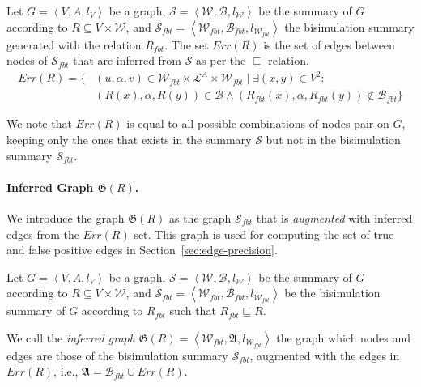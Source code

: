 \begin{definition}
Let $G=\left\langle V, A, l_V \right\rangle$ be a graph, $\mathcal{S} = \left\langle \mathcal{W}, \mathcal{B}, l_{\mathcal{W}} \right\rangle$ be the summary of $G$ according to $R \subseteq V \times \mathcal{W}$, and $\mathcal{S}_{fbt} = \left\langle \mathcal{W}_{fbt}, \mathcal{B}_{fbt}, l_{\mathcal{W}_{fbt}} \right\rangle$ the bisimulation summary generated with the relation $R_{fbt}$.
The set $Err(R)$ is the set of edges between nodes of $\mathcal{S}_{fbt}$ that are inferred from $\mathcal{S}$ as per the $\sqsubseteq$ relation.
\begin{equation*}
\begin{split}
Err(R) = \{ & (u, \alpha, v) \in \mathcal{W}_{fbt} \times \mathcal{L}^A \times \mathcal{W}_{fbt} \mid \exists (x, y) \in V^2 :\\
 & (R(x), \alpha, R(y)) \in \mathcal{B} \wedge (R_{fbt}(x), \alpha, R_{fbt}(y)) \not \in \mathcal{B}_{fbt} \}
\end{split}
\end{equation*}
\end{definition}

We note that $Err(R)$ is equal to all possible combinations of nodes pair on $G$, keeping only the ones that exists in the summary $\mathcal{S}$ but not in the bisimulation summary $\mathcal{S}_{fbt}$.

\paragraph{Inferred Graph $\mathfrak{G}(R)$.}

We introduce the graph $\mathfrak{G}(R)$ as the graph $\mathcal{S}_{fbt}$ that is \emph{augmented} with inferred edges from the $Err(R)$ set. This graph is used for computing the set of true and false positive edges in Section~\ref{sec:edge-precision}.

\begin{definition}
Let $G=\left\langle V, A, l_V \right\rangle$ be a graph, $\mathcal{S} = \left\langle \mathcal{W}, \mathcal{B}, l_{\mathcal{W}} \right\rangle$ be the summary of $G$ according to $R \subseteq V \times \mathcal{W}$, and $\mathcal{S}_{fbt} = \left\langle \mathcal{W}_{fbt}, \mathcal{B}_{fbt}, l_{\mathcal{W}_{fbt}} \right\rangle$ be the bisimulation summary of $G$ according to $R_{fbt}$ such that $R_{fbt} \sqsubseteq R$.

We call the \emph{inferred graph} $\mathfrak{G}(R) = \left\langle \mathcal{W}_{fbt}, \mathfrak{A}, l_{\mathcal{W}_{fbt}} \right\rangle$ the graph which nodes and edges are those of the bisimulation summary $\mathcal{S}_{fbt}$, augmented with the edges in $Err(R)$, i.e., $\mathfrak{A} = \mathcal{B}_{fbt} \cup Err(R)$.
\end{definition}

